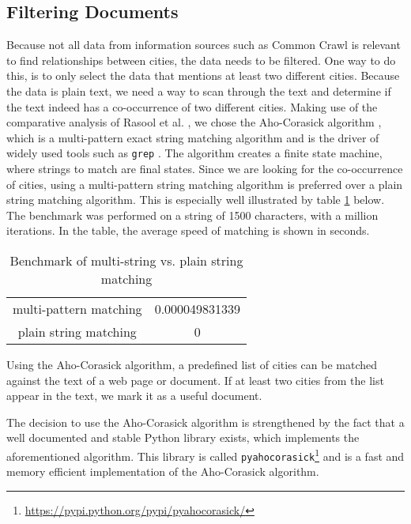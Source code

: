 \subsection{Filtering Documents}
Because not all data from information sources such as Common Crawl is relevant to find relationships between cities, the data needs to be filtered. One way to do this, is to only select the data that mentions at least two different cities. Because the data is plain text, we need a way to scan through the text and determine if the text indeed has a co-occurrence of two different cities.
Making use of the comparative analysis of Rasool et al. \cite{rasool2012string}, we chose the Aho-Corasick algorithm \cite{Aho-Corasick}, which is a multi-pattern exact string matching algorithm and is the driver of widely used tools such as \texttt{grep} \cite{kernighan1984unix}. The algorithm creates a finite state machine, where strings to match are final states. Since we are looking for the co-occurrence of cities, using a multi-pattern string matching algorithm is preferred over a plain string matching algorithm. This is especially well illustrated by table \ref{tab:bm-matching} below. The benchmark was performed on a string of 1500 characters, with a million iterations. In the table, the average speed of matching is shown in seconds.

\begin{table}
\centering
\begin{tabular}{ |c|c| } 
    \hline
    multi-pattern matching & 0.000049831339 \\
    plain string matching & 0 \\
    \hline
\end{tabular}
\caption{Benchmark of multi-string vs. plain string matching}
\label{tab:bm-matching}
\end{table}

Using the Aho-Corasick algorithm, a predefined list of cities can be matched against the text of a web page or document. If at least two cities from the list appear in the text, we mark it as a useful document.

The decision to use the Aho-Corasick algorithm is strengthened by the fact that a well documented and stable Python library exists, which implements the aforementioned algorithm. This library is called \texttt{pyahocorasick}\footnote{\url{https://pypi.python.org/pypi/pyahocorasick/}} and is a fast and memory efficient implementation of the Aho-Corasick algorithm.

